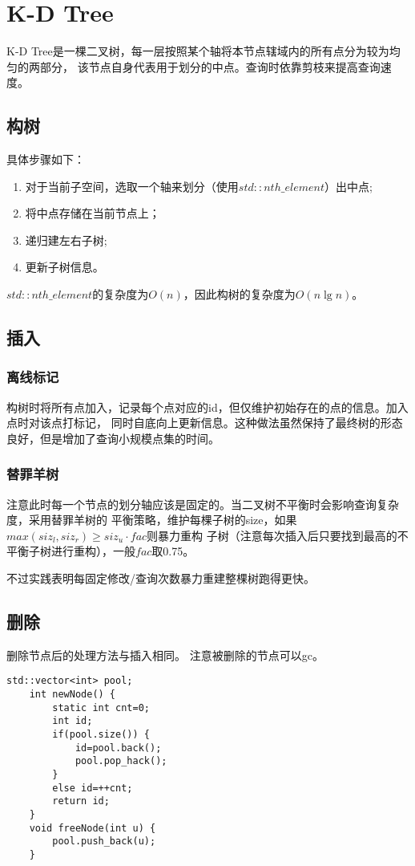 \section{K-D Tree}
K-D Tree是一棵二叉树，每一层按照某个轴将本节点辖域内的所有点分为较为均匀的两部分，
该节点自身代表用于划分的中点。查询时依靠剪枝来提高查询速度。
\subsection{构树}
具体步骤如下：
\begin{enumerate}
	\item 对于当前子空间，选取一个轴来划分（使用$std::nth\_element$）出中点;
	\item 将中点存储在当前节点上；
	\item 递归建左右子树;
	\item 更新子树信息。
\end{enumerate}
$std::nth\_element$的复杂度为$O(n)$，因此构树的复杂度为$O(n\lg n)$。
\subsection{插入}
\subsubsection{离线标记}
构树时将所有点加入，记录每个点对应的id，但仅维护初始存在的点的信息。加入点时对该点打标记，
同时自底向上更新信息。这种做法虽然保持了最终树的形态良好，但是增加了查询小规模点集的时间。
\subsubsection{替罪羊树}
注意此时每一个节点的划分轴应该是固定的。当二叉树不平衡时会影响查询复杂度，采用替罪羊树的
平衡策略，维护每棵子树的size，如果$max(siz_l,siz_r)\geq siz_u \cdot fac$则暴力重构
子树（注意每次插入后只要找到最高的不平衡子树进行重构），一般$fac$取0.75。

不过实践表明每固定修改/查询次数暴力重建整棵树跑得更快。
\subsection{删除}
删除节点后的处理方法与插入相同。
注意被删除的节点可以gc。

\begin{lstlisting}[title=gc]
    std::vector<int> pool;
    int newNode() {
        static int cnt=0;
        int id;
        if(pool.size()) {
            id=pool.back();
            pool.pop_hack();
        }
        else id=++cnt;
        return id;
    }
    void freeNode(int u) {
        pool.push_back(u);
    }
\end{lstlisting}

